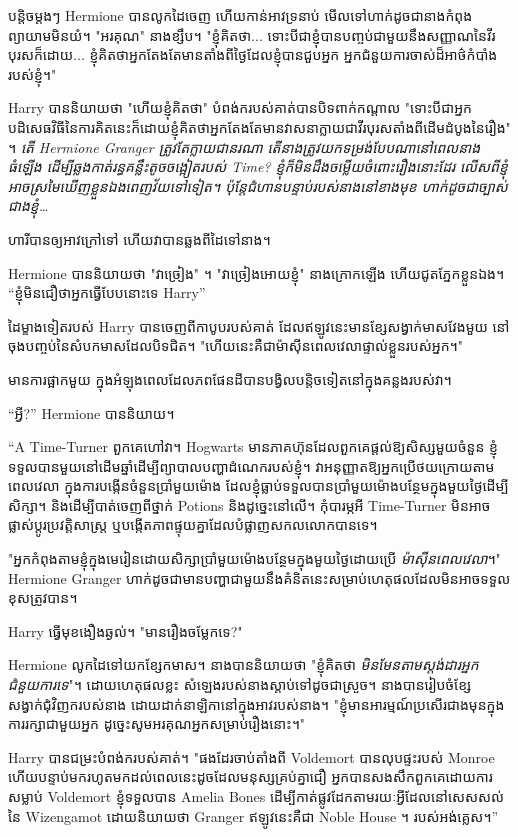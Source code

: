 {{បន្តិចម្ដងៗ Hermione បានលូកដៃចេញ ហើយកាន់អាវទ្រនាប់ មើលទៅហាក់ដូចជានាងកំពុងព្យាយាមមិនយំ។ "អរគុណ" នាងខ្សឹប។ "ខ្ញុំគិតថា... ទោះបីជាខ្ញុំបានបញ្ចប់ជាមួយនឹងសញ្ញាណនៃវីរបុរសក៏ដោយ... ខ្ញុំគិតថាអ្នកតែងតែមានតាំងពីថ្ងៃដែលខ្ញុំបានជួបអ្នក អ្នកជំនួយការចាស់ដ៏អាថ៌កំបាំងរបស់ខ្ញុំ។"

Harry បាននិយាយថា "ហើយខ្ញុំគិតថា" បំពង់ករបស់គាត់បានបិទពាក់កណ្តាល "ទោះបីជាអ្នកបដិសេធវិធីនៃការគិតនេះក៏ដោយខ្ញុំគិតថាអ្នកតែងតែមានវាសនាក្លាយជាវីរបុរសតាំងពីដើមដំបូងនៃរឿង" ។ \emph{តើ Hermione Granger ត្រូវតែក្លាយជានរណា តើនាងត្រូវយកទម្រង់បែបណានៅពេលនាងធំឡើង ដើម្បីឆ្លងកាត់រន្ធគន្លឹះតូចចង្អៀតរបស់ Time? ខ្ញុំ​ក៏​មិន​ដឹង​ចម្លើយ​ចំពោះ​រឿង​នោះ​ដែរ លើស​ពី​ខ្ញុំ​អាច​ស្រមៃ​ឃើញ​ខ្លួន​ឯង​ពេញ​វ័យ​ទៅ​ទៀត។ ប៉ុន្តែជំហានបន្ទាប់របស់នាងនៅខាងមុខ ហាក់ដូចជាច្បាស់ជាងខ្ញុំ… }

ហារី​បាន​ឲ្យ​អាវ​ក្រៅ​ទៅ ហើយ​វា​បាន​ឆ្លង​ពី​ដៃ​ទៅ​នាង។

Hermione បាននិយាយថា "វាច្រៀង" ។ "វាច្រៀងអោយខ្ញុំ" នាងក្រោកឡើង ហើយជូតភ្នែកខ្លួនឯង។ “ខ្ញុំ​មិន​ជឿ​ថា​អ្នក​ធ្វើ​បែប​នោះ​ទេ Harry”

ដៃម្ខាងទៀតរបស់ Harry បានចេញពីកាបូបរបស់គាត់ ដែលឥឡូវនេះមានខ្សែសង្វាក់មាសវែងមួយ នៅចុងបញ្ចប់នៃសំបកមាសដែលបិទជិត។ "ហើយនេះគឺជាម៉ាស៊ីនពេលវេលាផ្ទាល់ខ្លួនរបស់អ្នក។"

មានការផ្អាកមួយ ក្នុងអំឡុងពេលដែលភពផែនដីបានបង្វិលបន្តិចទៀតនៅក្នុងគន្លងរបស់វា។

“អ្វី?” Hermione បាននិយាយ។

“A Time-Turner ពួកគេហៅវា។ Hogwarts មានភាគហ៊ុនដែលពួកគេផ្តល់ឱ្យសិស្សមួយចំនួន ខ្ញុំទទួលបានមួយនៅដើមឆ្នាំដើម្បីព្យាបាលបញ្ហាដំណេករបស់ខ្ញុំ។ វាអនុញ្ញាតឱ្យអ្នកប្រើថយក្រោយតាមពេលវេលា ក្នុងការបង្កើនចំនួនប្រាំមួយម៉ោង ដែលខ្ញុំធ្លាប់ទទួលបានប្រាំមួយម៉ោងបន្ថែមក្នុងមួយថ្ងៃដើម្បីសិក្សា។ និងដើម្បីបាត់ចេញពីថ្នាក់ Potions និងដូច្នេះនៅលើ។ កុំបារម្ភអី Time-Turner មិនអាចផ្លាស់ប្តូរប្រវត្តិសាស្រ្ត ឬបង្កើតភាពផ្ទុយគ្នាដែលបំផ្លាញសកលលោកបានទេ។

"អ្នកកំពុងតាមខ្ញុំក្នុងមេរៀនដោយសិក្សាប្រាំមួយម៉ោងបន្ថែមក្នុងមួយថ្ងៃដោយប្រើ \emph{ម៉ាស៊ីនពេលវេលា}។" Hermione Granger ហាក់ដូចជាមានបញ្ហាជាមួយនឹងគំនិតនេះសម្រាប់ហេតុផលដែលមិនអាចទទួលខុសត្រូវបាន។

Harry ធ្វើមុខងឿងឆ្ងល់។ "មានរឿងចម្លែកទេ?"

Hermione លូកដៃទៅយកខ្សែកមាស។ នាងបាននិយាយថា "ខ្ញុំគិតថា \emph{មិនមែនតាមស្តង់ដារអ្នកជំនួយការទេ}"។ ដោយហេតុផលខ្លះ សំឡេងរបស់នាងស្តាប់ទៅដូចជាស្រួច។ នាងបានរៀបចំខ្សែសង្វាក់ជុំវិញករបស់នាង ដោយដាក់នាឡិកានៅក្នុងអាវរបស់នាង។ "ខ្ញុំមានអារម្មណ៍ប្រសើរជាងមុនក្នុងការរក្សាជាមួយអ្នក ដូច្នេះសូមអរគុណអ្នកសម្រាប់រឿងនោះ។"

Harry បានជម្រះបំពង់ករបស់គាត់។ "ផងដែរចាប់តាំងពី Voldemort បានលុបផ្ទះរបស់ Monroe ហើយបន្ទាប់មករហូតមកដល់ពេលនេះដូចដែលមនុស្សគ្រប់គ្នាជឿ អ្នកបានសងសឹកពួកគេដោយការសម្លាប់ Voldemort ខ្ញុំទទួលបាន Amelia Bones ដើម្បីកាត់ផ្លូវដែកតាមរយៈអ្វីដែលនៅសេសសល់នៃ Wizengamot ដោយនិយាយថា Granger ឥឡូវនេះគឺជា Noble House ។ របស់អង់គ្លេស។”

}}
